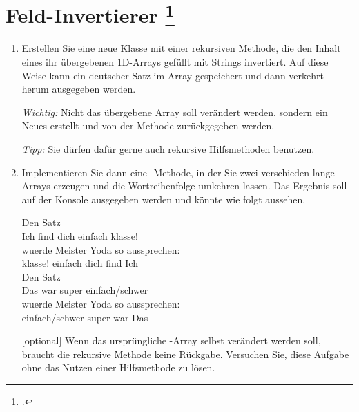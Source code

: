 \documentclass{bschlangaul-aufgabe}
\begin{document}

\section{Feld-Invertierer
\footcite[Aufgabenblatt 2: Rekursion, Sortieren, Komplexität, Arrays und
Rekursion, Diese Aufgabe stammt aus der Vorlesung Konzepte der
Programmierung von Prof. Bernhard Westfechtel der Universität Bayreuth,
WS 2017/18, Übungsblatt 8 und wurde dankenswerterweise zur Verwendung in
diesem Aufgabenblatt zur Verfügung gestellt, Aufgabe 1]{aud:ab:2}}

\begin{enumerate}

%

\item Erstellen Sie eine neue Klasse  mit
einer rekursiven Methode, die den Inhalt eines ihr übergebenen 1D-Arrays
gefüllt mit Strings invertiert. Auf diese Weise kann \zB ein deutscher
Satz im Array gespeichert und dann verkehrt herum ausgegeben werden.

\emph{Wichtig:} Nicht das übergebene Array soll verändert werden,
sondern ein Neues erstellt und von der Methode zurückgegeben werden.

\emph{Tipp:} Sie dürfen dafür gerne auch rekursive Hilfsmethoden
benutzen.

%

\item Implementieren Sie dann eine -Methode, in der Sie
zwei verschieden lange -Arrays erzeugen und die
Wortreihenfolge umkehren lassen. Das Ergebnis soll auf der Konsole
ausgegeben werden und könnte \zB wie folgt aussehen.

\bigskip

{
\ttfamily
Den Satz\\
Ich find dich einfach klasse!\\
wuerde Meister Yoda so aussprechen:\\
klasse! einfach dich find Ich\\

Den Satz\\
Das war super einfach/schwer\\
wuerde Meister Yoda so aussprechen:\\
einfach/schwer super war Das
}

\bigskip

[optional] Wenn das ursprüngliche -Array selbst
verändert werden soll, braucht die rekursive Methode keine Rückgabe.
Versuchen Sie, diese Aufgabe ohne das Nutzen einer Hilfsmethode zu
lösen.

\begin{liAntwort}
\end{liAntwort}
\end{enumerate}
\end{document}
